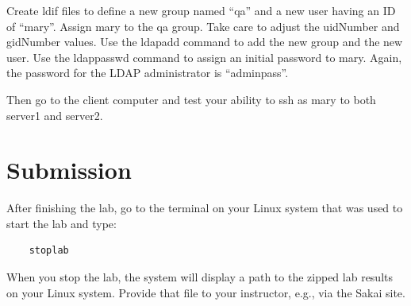 Create ldif files to define a new group named ``qa'' and a new user having an ID of ``mary''.
Assign mary to the qa group. Take care to adjust the uidNumber and gidNumber values.
Use the ldapadd command to add the new group and the new user.  Use the ldappasswd command to
assign an initial password to mary.  Again, the password for the LDAP administrator is ``adminpass''.

Then go to the client computer and test your ability to ssh as mary to both server1 and server2.

\section{Submission}
After finishing the lab, go to the terminal on your Linux system that was used to start the lab and type:
\begin{verbatim}
    stoplab 
\end{verbatim}
When you stop the lab, the system will display a path to the zipped lab results on your Linux system.  Provide that file to 
your instructor, e.g., via the Sakai site.


